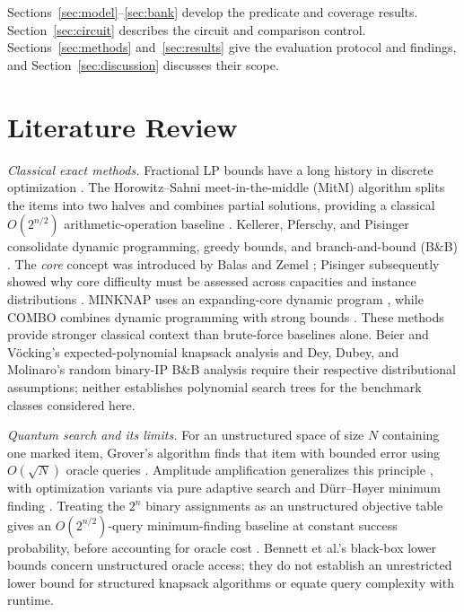 \documentclass[referee,pdflatex,sn-mathphys-num]{sn-jnl}
\theoremstyle{thmstyleone}
\theoremstyle{thmstyletwo}
\begin{document}
Sections~\ref{sec:model}--\ref{sec:bank} develop the predicate and coverage results. Section~\ref{sec:circuit} describes the circuit and comparison control. Sections~\ref{sec:methods} and~\ref{sec:results} give the evaluation protocol and findings, and Section~\ref{sec:discussion} discusses their scope.

\section{Literature Review}

\textit{Classical exact methods.} Fractional LP bounds have a long history in discrete optimization \cite{ref1}. The Horowitz--Sahni meet-in-the-middle (MitM) algorithm splits the items into two halves and combines partial solutions, providing a classical $O(2^{n/2})$ arithmetic-operation baseline \cite{ref2}. Kellerer, Pferschy, and Pisinger consolidate dynamic programming, greedy bounds, and branch-and-bound (B\&B) \cite{ref3}. The \emph{core} concept was introduced by Balas and Zemel \cite{balas1980core}; Pisinger subsequently showed why core difficulty must be assessed across capacities and instance distributions \cite{ref4}. MINKNAP uses an expanding-core dynamic program \cite{pisinger1997minimal}, while COMBO combines dynamic programming with strong bounds \cite{martello1999combo}. These methods provide stronger classical context than brute-force baselines alone. Beier and V\"ocking's expected-polynomial knapsack analysis \cite{beier2004random} and Dey, Dubey, and Molinaro's random binary-IP B\&B analysis \cite{dey2021random} require their respective distributional assumptions; neither establishes polynomial search trees for the benchmark classes considered here.

\textit{Quantum search and its limits.} For an unstructured space of size $N$ containing one marked item, Grover's algorithm finds that item with bounded error using $O(\sqrt{N})$ oracle queries \cite{ref8}. Amplitude amplification generalizes this principle \cite{ref11}, with optimization variants via pure adaptive search \cite{ref12} and D\"urr--H{\o}yer minimum finding \cite{ref13}. Treating the $2^n$ binary assignments as an unstructured objective table gives an $O(2^{n/2})$-query minimum-finding baseline at constant success probability, before accounting for oracle cost \cite{ref13}. Bennett et al.'s black-box lower bounds \cite{ref9} concern unstructured oracle access; they do not establish an unrestricted lower bound for structured knapsack algorithms or equate query complexity with runtime.
\end{document}
